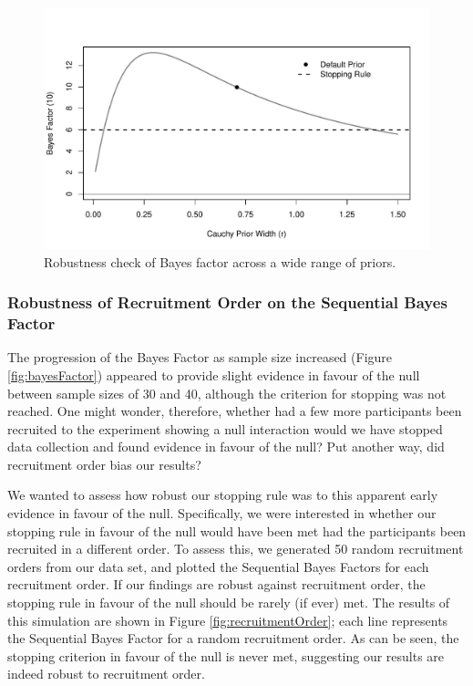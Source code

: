 \documentclass[a4paper, man, natbib]{apa6}
\begin{document}
\begin{figure}
\begin{center}
\includegraphics[width = \textwidth]{Images/robustPrior.pdf}
\caption{Robustness check of Bayes factor across a wide range of priors.}
\label{fig:robustPrior}
\end{center}
\end{figure}


\subsubsection{Robustness of Recruitment Order on the Sequential Bayes Factor}
The progression of the Bayes Factor as sample size increased (Figure \ref{fig:bayesFactor}) appeared to provide slight evidence in favour of the null between sample sizes of 30 and 40, although the criterion for stopping was not reached. One might wonder, therefore, whether had a few more participants been recruited to the experiment showing a null interaction would we have stopped data collection and found evidence in favour of the null? Put another way, did recruitment order bias our results?

We wanted to assess how robust our stopping rule was to this apparent early evidence in favour of the null. Specifically, we were interested in whether our stopping rule in favour of the null would have been met had the participants been recruited in a different order. To assess this, we generated 50 random recruitment orders from our data set, and plotted the Sequential Bayes Factors for each recruitment order. If our findings are robust against recruitment order, the stopping rule in favour of the null should be rarely (if ever) met.  The results of this simulation are shown in Figure \ref{fig:recruitmentOrder}; each line represents the Sequential Bayes Factor for a random recruitment order. As can be seen, the stopping criterion in favour of the null is never met, suggesting our results are indeed robust to recruitment order. 
\end{document}
